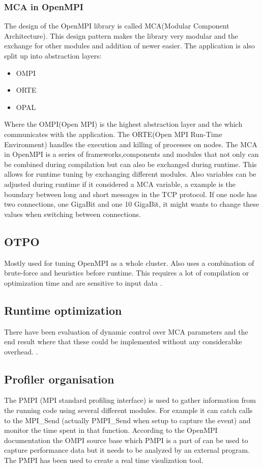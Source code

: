 \documentclass[thesis.tex]{subfiles}
\begin{document}
\subsubsection{MCA in OpenMPI}
The design of the OpenMPI library is called MCA(Modular Component Architecture). This design pattern makes the library very modular and the exchange for other modules and addition of newer easier. The application is also split up into abstraction layers:
\begin{itemize}
\item OMPI
\item ORTE
\item OPAL
\end{itemize}
Where the OMPI(Open MPI) is the highest abstraction layer and the which communicates with the application. The ORTE(Open MPI Run-Time Environment) handles the execution and killing of processes on nodes.
\newline
\newline
The MCA in OpenMPI is a series of frameworks,components and modules that not only can be combined during compilation but can also be exchanged during runtime. This allows for runtime tuning by exchanging different modules. Also variables can be adjusted during runtime if it considered a MCA variable, a example is the boundary between long and short messages in the TCP protocol. If one node has two connections, one GigaBit and one 10 GigaBit, it might wants to change these values when switching between connections.\cite{OpenMPI-tuning}

\subsection{OTPO}
Mostly used for tuning OpenMPI as a whole cluster. Also uses a combination of brute-force and heuristics before runtime. This requires a lot of compilation or optimization time and are sensitive to input data \cite{6355867}.

\subsection{Runtime optimization}
There have been evaluation of dynamic control over MCA parameters and the end result where that these could be implemented without any considerabke overhead.
\cite{Fagg}.

\subsection{Profiler organisation}
The PMPI (MPI standard profiling interface) is used to gather information from the running code using several different modules. For example it can catch calls to the MPI\_Send (actually PMPI\_Send when setup to capture the event) and monitor the time spent in that function. According to the OpenMPI documentation \cite{OpenMPI-profiling} the OMPI source base which PMPI is a part of can be used to capture performance data but it needs to be analyzed by an external program. The PMPI has been used to create a real time visulization tool\cite{Visualisation}. 
\end{document}
